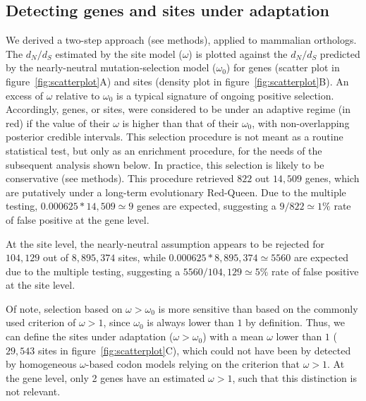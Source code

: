 \documentclass{article}
\newcommand{\dn}{d_N}
\newcommand{\ds}{d_S}
\newcommand{\dnds}{\dn / \ds}
\begin{document}
    \subsection*{Detecting genes and sites under adaptation}
    We derived a two-step approach (see methods), applied to mammalian orthologs.
    The $\dnds$ estimated by the site model ($\omega$) is plotted against the $\dnds$ predicted by the nearly-neutral mutation-selection model ($\omega_{0}$) for genes (scatter plot in figure~\ref{fig:scatterplot}A) and sites (density plot in figure~\ref{fig:scatterplot}B).
    An excess of $\omega$ relative to $\omega_{0}$ is a typical signature of ongoing positive selection\cite{bloom_identification_2017, rodrigue_detecting_2017}.
    Accordingly, genes, or sites, were considered to be under an adaptive regime (in red) if the value of their $\omega$ is higher than that of their $\omega_{0}$, with non-overlapping posterior credible intervals.
    This selection procedure is not meant as a routine statistical test, but only as an enrichment procedure, for the needs of the subsequent analysis shown below.
    In practice, this selection is likely to be conservative (see methods).
    This procedure retrieved $822$ out $14,509$ genes, which are putatively under a long-term evolutionary Red-Queen.
    Due to the multiple testing, $0.000625 * 14,509 \simeq 9$ genes are expected, suggesting a $9 / 822 \simeq 1\%$ rate of false positive at the gene level.

    At the site level, the nearly-neutral assumption appears to be rejected for $104,129$ out of $8,895,374$ sites, while $0.000625 * 8,895,374 \simeq 5560$ are expected due to the multiple testing, suggesting a $5560 / 104,129 \simeq 5\%$ rate of false positive at the site level.

    Of note, selection based on $\omega>\omega_{0}$ is more sensitive than based on the commonly used criterion of $\omega>1$, since $\omega_{0}$ is always lower than $1$ by definition\cite{spielman_relationship_2015}.
    Thus, we can define the sites under adaptation ($\omega>\omega_{0}$) with a mean $\omega$ lower than $1$ ($29,543$ sites in figure~\ref{fig:scatterplot}C), which could not have been by detected by homogeneous $\omega$-based codon models relying on the criterion that $\omega>1$.
    At the gene level, only 2 genes have an estimated $\omega > 1$, such that this distinction is not relevant.
\end{document}
